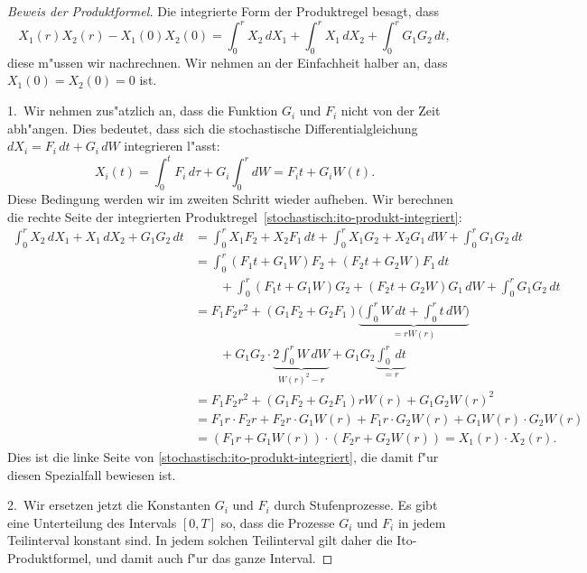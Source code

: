 \begin{proof}[Beweis der Produktformel]
Die integrierte Form der Produktregel besagt, dass 
\begin{equation}
X_1(r)X_2(r)-X_1(0)X_2(0)
=
\int_0^r X_2\,dX_1 + \int_0^r X_1\,dX_2 + \int_0^r G_1G_2\,dt,
\label{stochastisch:ito-produkt-integriert}
\end{equation}
diese m"ussen wir nachrechnen.
Wir nehmen an der Einfachheit halber an, dass $X_1(0)=X_2(0)=0$ ist.

1.~Wir nehmen zus"atzlich an, dass die Funktion $G_i$ und $F_i$ nicht von
der Zeit abh"angen.
Dies bedeutet, dass sich die stochastische Differentialgleichung
$dX_i=F_i\,dt+G_i\,dW$ integrieren l"asst:
\[
X_i(t) = \int_0^t F_i\,d\tau + G_i\int_0^r dW =  F_it+G_iW(t).
\]
Diese Bedingung werden wir im zweiten Schritt wieder aufheben.
Wir berechnen die rechte Seite der integrierten
Produktregel~\eqref{stochastisch:ito-produkt-integriert}:
\begin{align*}
\int_0^r X_2\,dX_1 + X_1\,dX_2 + G_1G_2\,dt
&=
\int_0^rX_1F_2+X_2F_1\,dt + \int_0^r X_1G_2+X_2G_1\,dW + \int_0^r G_1G_2\,dt
\\
&=
\int_0^r(F_1t+G_1W)F_2+(F_2t+G_2W)F_1\,dt
\\
&\qquad
+ \int_0^r (F_1t+G_1W)G_2+(F_2t+G_2W)G_1\,dW + \int_0^r G_1G_2\,dt
\\
&=F_1F_2r^2+(G_1F_2+G_2F_1)\underbrace{\biggl(\int_0^rW\,dt + \int_0^rt\,dW\biggr)}_{\textstyle = rW(r)}
\\
&\qquad
+G_1G_2\cdot \underbrace{2\int_0^r W\,dW}_{\textstyle W(r)^2-r}
+ G_1G_2\underbrace{\int_0^r\,dt}_{\textstyle =r}
\\
&= 
F_1F_2r^2 + (G_1F_2+G_2F_1)rW(r) + G_1G_2W(r)^2
\\
&= 
F_1r\cdot F_2r + F_2r\cdot G_1W(r)+F_1r\cdot G_2W(r) + G_1W(r)\cdot G_2W(r)
\\
&= 
(F_1r + G_1W(r))\cdot(F_2r +  G_2W(r))
=
X_1(r) \cdot X_2(r).
\end{align*}
Dies ist die linke Seite von \eqref{stochastisch:ito-produkt-integriert}, die
damit f"ur diesen Spezialfall bewiesen ist.

2.~Wir ersetzen jetzt die Konstanten $G_i$ und $F_i$ durch Stufenprozesse.
Es gibt eine Unterteilung des Intervals $[0,T]$ so, dass die Prozesse $G_i$
und $F_i$ in jedem Teilinterval konstant sind.
In jedem solchen Teilinterval gilt daher die Ito-Produktformel, und damit
auch f"ur das ganze Interval.


\end{proof}
